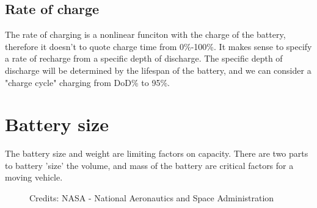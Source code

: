 \documentclass{article}
\begin{document}
\subsection{Rate of charge}
The rate of charging is a nonlinear funciton with the charge of the battery, therefore it doesn't to quote charge time from 0\%-100\%.
It makes sense to specify a rate of recharge from a specific depth of discharge.
The specific depth of discharge will be determined by the lifespan of the battery, and we can consider a "charge cycle" charging from DoD\% to 95\%.

\section{Battery size}
The battery size and weight are limiting factors on capacity.
There are two parts to battery 'size' the volume, and mass of the battery are critical factors for a moving vehicle.
\begin{figure}[H]
    \centering
    \caption{Credits: NASA - National Aeronautics and Space Administration}
    \label{fig:route}
\end{figure}
\end{document}
